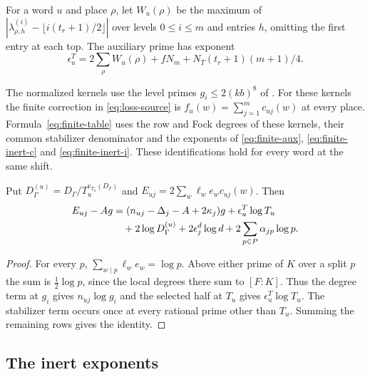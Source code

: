 For a word $u$ and place $\rho$, let $W_u(\rho)$ be the maximum of
$|\lambda^{(i)}_{\rho,h}-\lfloor i(t_r+1)/2\rfloor|$ over levels
$0\le i\le m$ and entries $h$, omitting the first entry at each top.
The auxiliary prime has exponent \citep[definition of \texttt{EatT}]{alpoge-finite-exponents}
\begin{equation}\label{eq:finite-aux}
 \epsilon_u^T=2\sum_\rho W_u(\rho)+fN_m+
                  N_T(t_r+1)(m+1)/4 .
\end{equation}

\begin{hypothesis}[\openinput]\label{hyp:finite-realization}
The normalized kernels use the level primes $g_i\le 2(kb)^8$ of
\citep[condition (D5)]{adriazola-grh}. For these kernels the finite correction
in \eqref{eq:loss-source} is $f_u(w)=\sum_{j=1}^m c_{uj}(w)$ at every
place. Formula~\eqref{eq:finite-table} uses the row and Fock degrees
of these kernels, their common stabilizer denominator and the exponents
of \eqref{eq:finite-aux}, \eqref{eq:finite-inert-c} and \eqref{eq:finite-inert-i}.
These identifications hold for every word at the same shift.
\end{hypothesis}

\begin{lemma}\label{lem:finite-place-sum}
Put $D_\Gamma^{(u)}=D_\Gamma/T_u^{v_{T_u}(D_\Gamma)}$ and
$E_{uj}=2\sum_w\ell_we_wc_{uj}(w)$. Then
\begin{align}
 E_{uj}-Ag
   &=(n_{uj}-\Delta_j-A+2\kappa_j)g+\epsilon_u^T\log T_u \notag\\
   &\quad+2\log D_\Gamma^{(u)}+2\epsilon_j^d\log d
                           +2\sum_{p\in P}\alpha_{jp}\log p .
 \label{eq:finite-place-sum}
\end{align}
\end{lemma}

\begin{proof}
For every $p$, $\sum_{w\mid p}\ell_we_w=\log p$. Above either
prime of $K$ over a split $p$ the sum is $\frac12\log p$, since
the local degrees there sum to $[F:K]$. Thus the degree term at
$g_i$ gives $n_{uj}\log g_i$ and the selected half at $T_u$ gives
$\epsilon_u^T\log T_u$. The stabilizer term occurs once at every rational
prime other than $T_u$. Summing the remaining rows gives the identity.
\end{proof}

\subsection{The inert exponents}

